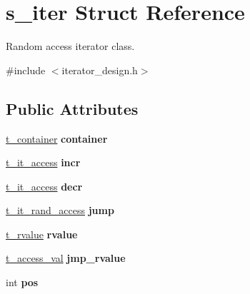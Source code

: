 \hypertarget{structs__iter}{}\section{s\+\_\+iter Struct Reference}
\label{structs__iter}


Random access iterator class.  




{\ttfamily \#include $<$iterator\+\_\+design.\+h$>$}

\subsection*{Public Attributes}
\begin{DoxyCompactItemize}
\item 
\hyperlink{container__design_8h_a2baa2855e4617ebc7ad317f13fda1cbe}{t\+\_\+container} {\bfseries container}\hypertarget{structs__iter_a2d371be179d6d8d045c21cccbe8bf1c1}{}\label{structs__iter_a2d371be179d6d8d045c21cccbe8bf1c1}

\item 
\hyperlink{iterator__design_8h_a1203fd2ea75505f64e67a2dbcff915df}{t\+\_\+it\+\_\+access} {\bfseries incr}\hypertarget{structs__iter_aac27c4fcca22024003e91dbd8945c9e1}{}\label{structs__iter_aac27c4fcca22024003e91dbd8945c9e1}

\item 
\hyperlink{iterator__design_8h_a1203fd2ea75505f64e67a2dbcff915df}{t\+\_\+it\+\_\+access} {\bfseries decr}\hypertarget{structs__iter_a5d1f677b2089d7e7ea1ffbf3e4d5afa3}{}\label{structs__iter_a5d1f677b2089d7e7ea1ffbf3e4d5afa3}

\item 
\hyperlink{iterator__design_8h_aff9751abfeb4ef33ddad4f4ac04c0dd9}{t\+\_\+it\+\_\+rand\+\_\+access} {\bfseries jump}\hypertarget{structs__iter_a91dcf7fd67124893a0d090ab551a852a}{}\label{structs__iter_a91dcf7fd67124893a0d090ab551a852a}

\item 
\hyperlink{iterator__design_8h_adc42acf2aeeeb2b9f67224f698a3d82f}{t\+\_\+rvalue} {\bfseries rvalue}\hypertarget{structs__iter_ad1bde7b77e1225ddc003ae662d25f5c2}{}\label{structs__iter_ad1bde7b77e1225ddc003ae662d25f5c2}

\item 
\hyperlink{iterator__design_8h_af8d5717881e10aa4ca524c87564a9434}{t\+\_\+access\+\_\+val} {\bfseries jmp\+\_\+rvalue}\hypertarget{structs__iter_a990089213dc4d89240a5038616e468f7}{}\label{structs__iter_a990089213dc4d89240a5038616e468f7}

\item 
int {\bfseries pos}\hypertarget{structs__iter_a8296fa321097681ddaf026197a7257ad}{}\label{structs__iter_a8296fa321097681ddaf026197a7257ad}

\end{DoxyCompactItemize}


